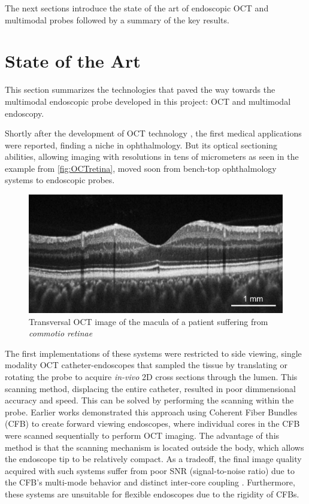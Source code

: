 The next sections introduce the state of the art of endoscopic OCT and multimodal probes followed by a summary of the key results.

\section{State of the Art}
This section summarizes the technologies that paved the way towards the multimodal endoscopic probe developed in this project: OCT and multimodal endoscopy.

Shortly after the development of OCT technology \cite{Huang1991}, the first medical applications were reported, finding a niche in ophthalmology. But its optical sectioning abilities, allowing imaging with resolutions in tens of micrometers as seen in the example from \autoref{fig:OCTretina}, moved soon from bench-top ophthalmology systems to endoscopic probes.  
\begin{figure}[h!]\centering
      \includegraphics{figures/10_Introduction/oct.pdf}
      \caption{Transversal OCT image of the macula of a patient suffering from \textit{commotio retinae}\cite{Flatter2013}}
      \label{fig:OCTretina}
\end{figure}
The first implementations of these systems were restricted to side viewing, single modality OCT catheter-endoscopes that sampled the tissue by translating \cite{Feldchtein1998} or rotating \cite{Tearney1994} \cite{Tearney1996} the probe to acquire \textit{in-vivo} 2D cross sections through the lumen. This scanning method, displacing the entire catheter, resulted in poor dimmensional accuracy and speed. This can be solved by performing the scanning within the probe. Earlier works demonstrated this approach using Coherent Fiber Bundles (CFB) to create forward viewing endoscopes, where individual cores in the CFB were scanned sequentially to perform OCT imaging. The advantage of this method is that the scanning mechanism is located outside the body, which allows the endoscope tip to be relatively compact. As a tradeoff, the final image quality acquired with such systems suffer from poor SNR (signal-to-noise ratio) due to the CFB’s multi-mode behavior and distinct inter-core coupling \cite{Xie2005}. Furthermore, these systems are unsuitable for flexible endoscopes due to the rigidity of CFBs.

